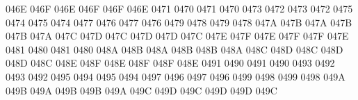 \setcclcucx 046E 046F 046E %
\setcclcucx 046F 046F 046E %
 0471 0470 %
 0471 0470 %
 0473 0472 %
 0473 0472 %
 0475 0474 %
 0475 0474 %
 0477 0476 %
 0477 0476 %
 0479 0478 %
 0479 0478 %
\setcclcucx 047A 047B 047A %
\setcclcucx 047B 047B 047A %
\setcclcucx 047C 047D 047C %
\setcclcucx 047D 047D 047C %
\setcclcucx 047E 047F 047E %
\setcclcucx 047F 047F 047E %
 0481 0480 %
 0481 0480 %
\setcclcucx 048A 048B 048A %
\setcclcucx 048B 048B 048A %
\setcclcucx 048C 048D 048C %
\setcclcucx 048D 048D 048C %
\setcclcucx 048E 048F 048E %
\setcclcucx 048F 048F 048E %
 0491 0490 %
 0491 0490 %
 0493 0492 %
 0493 0492 %
 0495 0494 %
 0495 0494 %
 0497 0496 %
 0497 0496 %
 0499 0498 %
 0499 0498 %
\setcclcucx 049A 049B 049A %
\setcclcucx 049B 049B 049A %
\setcclcucx 049C 049D 049C %
\setcclcucx 049D 049D 049C %
